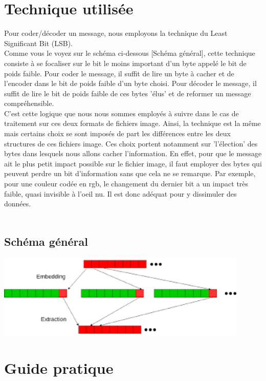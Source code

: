 \section{Technique utilisée}
Pour coder/décoder un message, nous employons la technique du Least Significant Bit (LSB). \\
Comme vous le voyez sur le schéma ci-dessous [Schéma général], cette technique consiste à se focaliser sur le bit le moins 
important d'un byte appelé le bit de poids faible.
Pour coder le message, il suffit de lire un byte à cacher et de l'encoder dans le bit de poids faible d'un byte choisi.
Pour décoder le message, il suffit de lire le bit de poids faible de ces bytes 'élus' et de reformer un message compréhensible.\\
C'est cette logique que nous nous sommes employés à suivre dans le cas de traitement sur ces deux formats de fichiers image.
Ainsi, la technique est la même mais certains choix se sont imposés de part les différences entre les deux structures de ces 
fichiers image. Ces choix portent notamment sur 'l'élection' des bytes dans lesquels nous allons cacher l'information.
En effet, pour que le message ait le plus petit impact possible sur le fichier image, il faut employer des bytes qui peuvent
perdre un bit d'information sans que cela ne se remarque.
Par exemple, pour une couleur codée en rgb, le changement du dernier bit a un impact très faible, quasi invisible à l'oeil nu.
Il est donc adéquat pour y dissimuler des données.\\\\

\subsection{Schéma général}
\includegraphics[width=12cm]{lsb.eps}

\vspace{1.5cm}

\section{Guide pratique}

